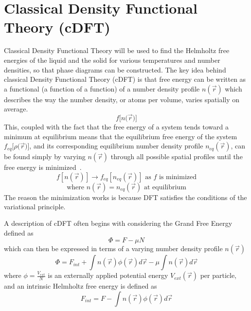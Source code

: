 \documentclass[double,12pt]{beavtex}
\begin{document}
\section{Classical Density Functional Theory (cDFT)}

Classical Density Functional Theory will be used to find the 
Helmholtz free energies of the liquid and the solid for various 
temperatures and number densities, so that phase diagrams can be 
constructed. 
The key idea behind classical Density Functional Theory (cDFT) is that 
free energy can be written as a functional (a function of a function) of 
a number density profile $n(\vec{r})$ which describes the way the number 
density, or atoms per volume, varies spatially on average. 
\begin{displaymath}{f[n(}\vec{r}{)]}\end{displaymath}
This, coupled with the fact that the free energy of a system tends toward 
a minimum at equilibrium means that the equilibrium free energy of the 
system ${f_{eq}}{[}\rho{(}\vec{r}{)]}$, and its corresponding equilibrium 
number density profile $n_{eq}(\vec r)$, can be found simply by varying 
$n(\vec{r})$ through all possible spatial profiles until the free energy 
is minimized~\cite{MoritaDFT}. 
\begin{displaymath}f[n(\vec r)]\rightarrow f_{eq}[n_{eq}(\vec r)]  \mbox{ as $f$ is minimized} \end{displaymath}
\begin{displaymath}{\mbox{where }  n(\vec{r})=n_{eq}(\vec r)  \mbox{ at equilibrium}}\end{displaymath}
The reason the minimization works is because DFT satisfies the conditions 
of the variational principle. 

A description of cDFT often begins with considering the Grand Free 
Energy defined as
\begin{equation}\Phi=F-\mu{N}\end{equation}
which can then be expressed in terms of a varying number density 
profile $n(\vec r)$
\begin{equation}\label{GrandFE}\Phi= F_{int} +\int n(\vec{r})\phi{(\vec r)}d\vec{r}-\mu\int n(\vec r)d\vec{r}\end{equation}
where $\phi=\frac{V_{ext}}{N}$ is an externally applied potential energy 
$V_{ext}(\vec r)$ per particle, and an intrinsic Helmholtz free energy 
is defined as
\begin{equation}F_{int} = F - \int n(\vec{r})\phi{(\vec r)}d\vec{r}\end{equation}  
\end{document}
